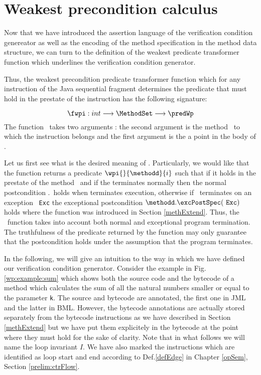  


\section{Weakest precondition calculus} \label{wpRules}


Now that we have introduced the assertion language of the verification condition genereator
as well as the encoding of the method specification 
in the method data structure, we can turn to the definition of the weakest predicate transformer function 
which underlines the verification condition generator.
 
Thus, the weakest precondition predicate transformer function which for any instruction of the Java sequential fragment
determines the predicate that must hold in the prestate of the instruction has the following signature:

$$ \fwpi :   int  \longrightarrow   \MethodSet   \longrightarrow \predWp $$
The function \fwpi \ takes two arguments : 
the second argument is the method \methodd \ to which the  instruction belongs
and  the first argument is  the a point  in the body of  \methodd.

Let us first see what is the desired meaning of \fwpi.
Particularly, we would like that the function \fwpi{}  returns a predicate $\wpi{}{\methodd}{i}$
such that  if it holds in the prestate of the method \methodd \  and if the
\methodd{} terminates normally then the normal postcondition \methodd.\normalPost \ holds when 
\methodd{} terminates execution, otherwise if \methodd \ terminates on an exception
\mbox{ \rm \texttt{Exc}} the exceptional postcondition  $\methodd.\excPostSpec(\mbox{ \rm \texttt{Exc}})$ holds where the function \excPostSpec{} was
introduced in Section \ref{methExtend}. Thus, the \fwpi \ function takes into account both normal and exceptional
program termination. The truthfulness of the predicate returned by the \fwpi{} function
may only guarantee that the postcondition holds under the assumption that the program terminates.
 
 In the following, we will give an intuition to the way in which we have defined our verification condition generator.
 Consider the example in Fig. \ref{wp:example:sum} which 
 shows both the source code and the bytecode of a method which calculates the sum of all the natural numbers
 smaller or equal to the parameter \lstinline!k!. The source and bytecode are annotated, the first one in JML and the latter in BML.
 However, the bytecode annotations are actually stored separately from the bytecode instructions as we have described in Section \ref{methExtend}
 but we have put them explicitely in the bytecode at the point where they must hold for the sake of clarity. 
 Note that in what follows we will name the loop invariant $I$.
 We have also marked the instructions which are identified as loop start and end
 according to Def.\ref{defEdge} in Chapter \ref{opSem}, Section \ref{prelim:ctrFlow}. 


